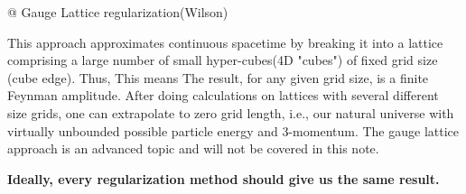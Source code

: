 \begin{easylist}
@ Gauge Lattice regularization(Wilson)

This approach approximates continuous spacetime by breaking it into a lattice comprising a large number of small hyper-cubes(4D "cubes") of fixed grid size (cube edge). Thus, \textbf{} This means  The result, for any given grid size, is a finite Feynman amplitude. After doing calculations on lattices with several different size grids, one can extrapolate to zero grid length, i.e., our natural universe with virtually unbounded possible particle energy and 3-momentum. The gauge lattice approach is an advanced topic and will not be covered in this note.
\end{easylist}
\textbf{Ideally, every regularization method should give us the same result.}

